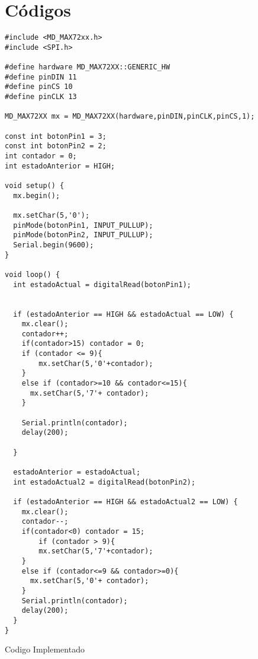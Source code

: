 \section{Códigos}

\begin{listing}[H]
  \scriptsize
  \begin{verbatim}
#include <MD_MAX72xx.h>
#include <SPI.h>

#define hardware MD_MAX72XX::GENERIC_HW
#define pinDIN 11
#define pinCS 10
#define pinCLK 13

MD_MAX72XX mx = MD_MAX72XX(hardware,pinDIN,pinCLK,pinCS,1);

const int botonPin1 = 3;  
const int botonPin2 = 2;
int contador = 0;         
int estadoAnterior = HIGH; 

void setup() {
  mx.begin();
  
  mx.setChar(5,'0');
  pinMode(botonPin1, INPUT_PULLUP); 
  pinMode(botonPin2, INPUT_PULLUP);
  Serial.begin(9600);
}

void loop() {
  int estadoActual = digitalRead(botonPin1);
  

  if (estadoAnterior == HIGH && estadoActual == LOW) {
    mx.clear();
    contador++;
    if(contador>15) contador = 0;
    if (contador <= 9){
        mx.setChar(5,'0'+contador);
    }
    else if (contador>=10 && contador<=15){
      mx.setChar(5,'7'+ contador);
    }
    
    Serial.println(contador);
    delay(200); 
    
  }
  
  estadoAnterior = estadoActual; 
  int estadoActual2 = digitalRead(botonPin2);

  if (estadoAnterior == HIGH && estadoActual2 == LOW) {
    mx.clear();
    contador--;
    if(contador<0) contador = 15;
        if (contador > 9){
        mx.setChar(5,'7'+contador);
    }
    else if (contador<=9 && contador>=0){
      mx.setChar(5,'0'+ contador);
    }
    Serial.println(contador);
    delay(200);
  }
}
  \end{verbatim}
  \caption{Codigo Implementado}
  \label{lst:cod-1}
\end{listing}
